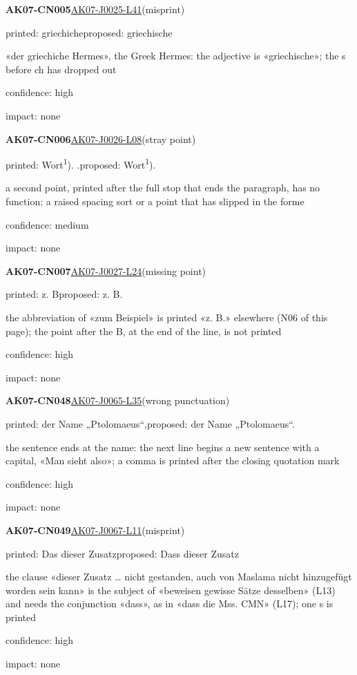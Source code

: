 \documentclass[11pt]{article}
\begin{document}
\noindent\textbf{AK07-CN005}\enspace\hyperlink{AK07-J0025-L41}{AK07-J0025-L41}\enspace(misprint)\par\noindent printed: griechiche\enspace proposed: griechische\par\noindent «der griechiche Hermes», the Greek Hermes: the adjective is «griechische»; the s before ch has dropped out\par\noindent confidence: high\par\noindent impact: none\par\medskip
\noindent\textbf{AK07-CN006}\enspace\hyperlink{AK07-J0026-L08}{AK07-J0026-L08}\enspace(stray point)\par\noindent printed: Wort\textsuperscript{1}). .\enspace proposed: Wort\textsuperscript{1}).\par\noindent a second point, printed after the full stop that ends the paragraph, has no function; a raised spacing sort or a point that has slipped in the forme\par\noindent confidence: medium\par\noindent impact: none\par\medskip
\noindent\textbf{AK07-CN007}\enspace\hyperlink{AK07-J0027-L24}{AK07-J0027-L24}\enspace(missing point)\par\noindent printed: z. B\enspace proposed: z. B.\par\noindent the abbreviation of «zum Beispiel» is printed «z. B.» elsewhere (N06 of this page); the point after the B, at the end of the line, is not printed\par\noindent confidence: high\par\noindent impact: none\par\medskip
\noindent\textbf{AK07-CN048}\enspace\hyperlink{AK07-J0065-L35}{AK07-J0065-L35}\enspace(wrong punctuation)\par\noindent printed: der Name „Ptolomaeus“,\enspace proposed: der Name „Ptolomaeus“.\par\noindent the sentence ends at the name: the next line begins a new sentence with a capital, «Man sieht also»; a comma is printed after the closing quotation mark\par\noindent confidence: high\par\noindent impact: none\par\medskip
\noindent\textbf{AK07-CN049}\enspace\hyperlink{AK07-J0067-L11}{AK07-J0067-L11}\enspace(misprint)\par\noindent printed: Das dieser Zusatz\enspace proposed: Dass dieser Zusatz\par\noindent the clause «dieser Zusatz … nicht gestanden, auch von Maslama nicht hinzugefügt worden sein kann» is the subject of «beweisen gewisse Sätze desselben» (L13) and needs the conjunction «dass», as in «dass die Mss. CMN» (L17); one s is printed\par\noindent confidence: high\par\noindent impact: none\par\medskip
\end{document}
